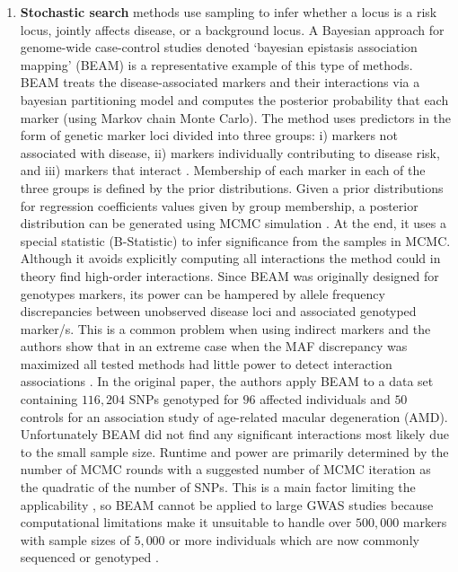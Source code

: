 \begin{enumerate}
	\item \textbf{Stochastic search} methods use sampling to infer whether a locus is a risk locus, jointly affects disease, or a background locus.
A Bayesian approach for genome-wide case-control studies denoted `bayesian epistasis association mapping' (BEAM) \cite{zhang2007bayesian} is a representative example of this type of methods.
 BEAM treats the disease-associated markers and their interactions via a bayesian partitioning model and computes the posterior probability that each marker (using Markov chain Monte Carlo).
The method uses predictors in the form of genetic marker loci divided into three groups: i) markers not associated with disease, ii) markers individually contributing to disease risk, and iii) markers that interact \cite{zhang2007bayesian}.
Membership of each marker in each of the three groups is defined by the prior distributions.
Given a prior distributions for regression coefficients values given by group membership, a posterior distribution can be generated using MCMC simulation \cite{cordell2009detecting}.
At the end, it uses a special statistic (B-Statistic) to infer significance from the samples in MCMC. 
Although it avoids explicitly computing all interactions the method could in theory find high-order interactions. 
Since BEAM was originally designed for genotypes markers, its power can be hampered by allele frequency discrepancies between unobserved disease loci and associated genotyped marker/s\cite{zhang2007bayesian}.
This is a common problem when using indirect markers and the authors show that in an extreme case when the MAF discrepancy was maximized all tested methods had little power to detect interaction associations \cite{zhang2007bayesian}.
In the original paper, the authors apply BEAM to a data set containing $116,204$ SNPs genotyped for $96$ affected individuals and $50$ controls for an association study of age-related macular degeneration (AMD).
Unfortunately BEAM did not find any significant interactions \cite{zhang2007bayesian} most likely due to the small sample size.
Runtime and power are primarily determined by the number of MCMC rounds with a suggested number of MCMC iteration as the quadratic of the number of SNPs.
This is a main factor limiting the applicability \cite{li2011detecting}, so BEAM cannot be applied to large GWAS studies because computational limitations make it unsuitable to handle over $500,000$ markers with sample sizes of $5,000$ or more individuals which are now commonly sequenced or genotyped \cite{cordell2009detecting}.


\end{enumerate}
